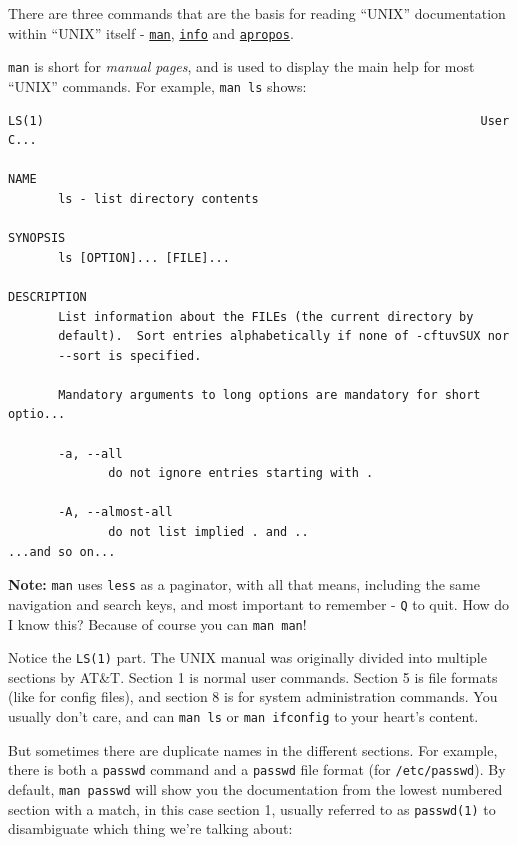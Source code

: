 \documentclass[10pt,]{book}
\numberwithin{figure}{chapter}
\begin{document}
There are three commands that are the basis for reading ``UNIX''
documentation within ``UNIX'' itself -
\href{http://linux.die.net/man/1/man}{\texttt{man}},
\href{http://linux.die.net/man/1/info}{\texttt{info}} and
\href{http://linux.die.net/man/1/apropos}{\texttt{apropos}}.

\texttt{man} is short for \emph{manual pages}, and is used to display
the main help for most ``UNIX'' commands. For example, \texttt{man ls}
shows:

\begin{verbatim}
LS(1)                                                             User C...

NAME
       ls - list directory contents

SYNOPSIS
       ls [OPTION]... [FILE]...

DESCRIPTION
       List information about the FILEs (the current directory by
       default).  Sort entries alphabetically if none of -cftuvSUX nor
       --sort is specified.

       Mandatory arguments to long options are mandatory for short optio...

       -a, --all
              do not ignore entries starting with .

       -A, --almost-all
              do not list implied . and ..
...and so on...
\end{verbatim}

\textbf{Note:} \texttt{man} uses \texttt{less} as a paginator, with all
that means, including the same navigation and search keys, and most
important to remember - \texttt{Q} to quit. How do I know this? Because
of course you can \texttt{man man}!

Notice the \texttt{LS(1)} part. The UNIX manual was originally divided
into multiple sections by AT\&T. Section 1 is normal user commands.
Section 5 is file formats (like for config files), and section 8 is for
system administration commands. You usually don't care, and can
\texttt{man ls} or \texttt{man ifconfig} to your heart's content.

But sometimes there are duplicate names in the different sections. For
example, there is both a \texttt{passwd} command and a \texttt{passwd}
file format (for \texttt{/etc/passwd}). By default, \texttt{man passwd}
will show you the documentation from the lowest numbered section with a
match, in this case section 1, usually referred to as \texttt{passwd(1)}
to disambiguate which thing we're talking about:
\end{document}
